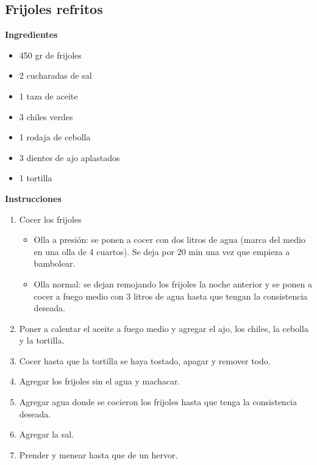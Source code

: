 \subsection{Frijoles refritos}
\label{sec:frijoles-refritos}

\textbf{Ingredientes}
\begin{itemize}
\item 450 gr de frijoles
\item 2 cucharadas de sal
\item 1 taza de aceite
\item 3 chiles verdes
\item 1 rodaja de cebolla
\item 3 dientes de ajo aplastados
\item 1 tortilla
\end{itemize}

\textbf{Instrucciones}
\begin{enumerate}
\item Cocer los frijoles
\begin{itemize}
\item Olla a presión: se ponen a cocer con dos litros de agua (marca del medio en una olla de 4 cuartos). Se deja por 20 min una vez que empieza a bambolear. 
\item Olla normal: se dejan remojando los frijoles la noche anterior y se ponen a cocer a fuego medio con 3 litros de agua hasta que tengan la consistencia deseada.
\end{itemize}
\item Poner a calentar el aceite a fuego medio y agregar el ajo, los chiles, la cebolla y la tortilla. 
\item Cocer hasta que la tortilla se haya tostado, apagar y remover todo.
\item Agregar los frijoles sin el agua y machacar.
\item Agregar agua donde se cocieron los frijoles hasta que tenga la consistencia deseada.
\item Agregar la sal.
\item Prender y menear hasta que de un hervor.
\end{enumerate}
